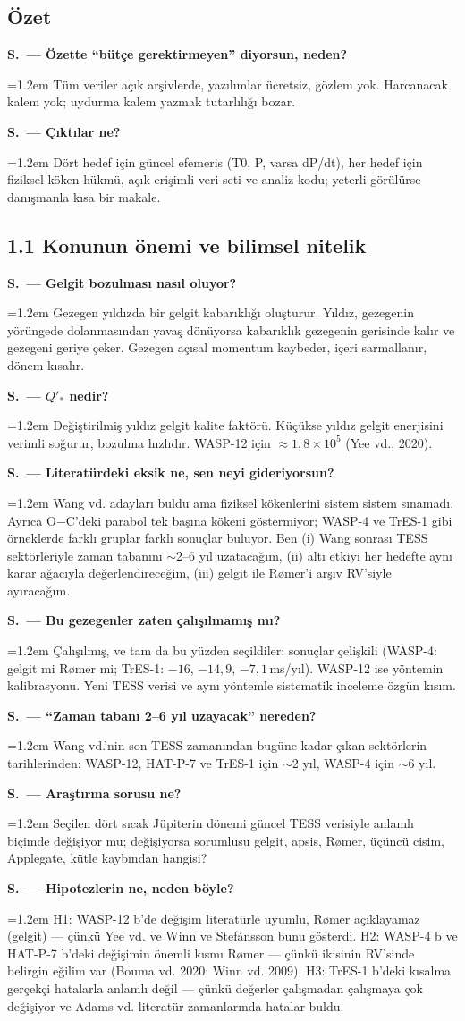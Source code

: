 \documentclass[11pt,a4paper]{article}
\newcounter{sor}[section]
\newcommand{\SC}[2]{\stepcounter{sor}\par\noindent\textbf{S\thesection.\thesor\ — #1}\par\nopagebreak
  \noindent\hangindent=1.2em\hangafter=0 #2\par\vspace{0.35em}}
\newcommand{\OC}{O$-$C}
\newcommand{\msyil}{\,ms/yıl}
\begin{document}
\subsection{Özet}
\SC{Özette ``bütçe gerektirmeyen'' diyorsun, neden?}{Tüm veriler açık arşivlerde, yazılımlar ücretsiz, gözlem yok. Harcanacak kalem yok; uydurma kalem yazmak tutarlılığı bozar.}
\SC{Çıktılar ne?}{Dört hedef için güncel efemeris (T0, P, varsa dP/dt), her hedef için fiziksel köken hükmü, açık erişimli veri seti ve analiz kodu; yeterli görülürse danışmanla kısa bir makale.}

\subsection{1.1 Konunun önemi ve bilimsel nitelik}
\SC{Gelgit bozulması nasıl oluyor?}{Gezegen yıldızda bir gelgit kabarıklığı oluşturur. Yıldız, gezegenin yörüngede dolanmasından yavaş dönüyorsa kabarıklık gezegenin gerisinde kalır ve gezegeni geriye çeker. Gezegen açısal momentum kaybeder, içeri sarmallanır, dönem kısalır.}
\SC{$Q'_*$ nedir?}{Değiştirilmiş yıldız gelgit kalite faktörü. Küçükse yıldız gelgit enerjisini verimli soğurur, bozulma hızlıdır. WASP-12 için $\approx 1{,}8\times10^5$ (Yee vd., 2020).}
\SC{Literatürdeki eksik ne, sen neyi gideriyorsun?}{Wang vd. adayları buldu ama fiziksel kökenlerini sistem sistem sınamadı. Ayrıca \OC{}'deki parabol tek başına kökeni göstermiyor; WASP-4 ve TrES-1 gibi örneklerde farklı gruplar farklı sonuçlar buluyor. Ben (i) Wang sonrası TESS sektörleriyle zaman tabanını $\sim$2--6 yıl uzatacağım, (ii) altı etkiyi her hedefte aynı karar ağacıyla değerlendireceğim, (iii) gelgit ile Rømer'i arşiv RV'siyle ayıracağım.}
\SC{Bu gezegenler zaten çalışılmamış mı?}{Çalışılmış, ve tam da bu yüzden seçildiler: sonuçlar çelişkili (WASP-4: gelgit mi Rømer mi; TrES-1: $-16$, $-14{,}9$, $-7{,}1$\msyil). WASP-12 ise yöntemin kalibrasyonu. Yeni TESS verisi ve aynı yöntemle sistematik inceleme özgün kısım.}
\SC{``Zaman tabanı 2--6 yıl uzayacak'' nereden?}{Wang vd.'nin son TESS zamanından bugüne kadar çıkan sektörlerin tarihlerinden: WASP-12, HAT-P-7 ve TrES-1 için $\sim$2 yıl, WASP-4 için $\sim$6 yıl.}
\SC{Araştırma sorusu ne?}{Seçilen dört sıcak Jüpiterin dönemi güncel TESS verisiyle anlamlı biçimde değişiyor mu; değişiyorsa sorumlusu gelgit, apsis, Rømer, üçüncü cisim, Applegate, kütle kaybından hangisi?}
\SC{Hipotezlerin ne, neden böyle?}{H1: WASP-12 b'de değişim literatürle uyumlu, Rømer açıklayamaz (gelgit) — çünkü Yee vd. ve Winn ve Stefánsson bunu gösterdi. H2: WASP-4 b ve HAT-P-7 b'deki değişimin önemli kısmı Rømer — çünkü ikisinin RV'sinde belirgin eğilim var (Bouma vd. 2020; Winn vd. 2009). H3: TrES-1 b'deki kısalma gerçekçi hatalarla anlamlı değil — çünkü değerler çalışmadan çalışmaya çok değişiyor ve Adams vd. literatür zamanlarında hatalar buldu.}
\end{document}
